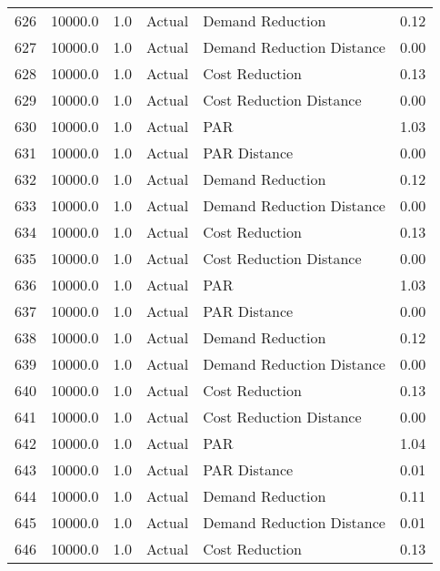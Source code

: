 \begin{longtable}{lrrllr}
626  &      10000.0 &     1.0 &         Actual &           Demand Reduction &   0.12 \\
627  &      10000.0 &     1.0 &         Actual &  Demand Reduction Distance &   0.00 \\
628  &      10000.0 &     1.0 &         Actual &             Cost Reduction &   0.13 \\
629  &      10000.0 &     1.0 &         Actual &    Cost Reduction Distance &   0.00 \\
630  &      10000.0 &     1.0 &         Actual &                        PAR &   1.03 \\
631  &      10000.0 &     1.0 &         Actual &               PAR Distance &   0.00 \\
632  &      10000.0 &     1.0 &         Actual &           Demand Reduction &   0.12 \\
633  &      10000.0 &     1.0 &         Actual &  Demand Reduction Distance &   0.00 \\
634  &      10000.0 &     1.0 &         Actual &             Cost Reduction &   0.13 \\
635  &      10000.0 &     1.0 &         Actual &    Cost Reduction Distance &   0.00 \\
636  &      10000.0 &     1.0 &         Actual &                        PAR &   1.03 \\
637  &      10000.0 &     1.0 &         Actual &               PAR Distance &   0.00 \\
638  &      10000.0 &     1.0 &         Actual &           Demand Reduction &   0.12 \\
639  &      10000.0 &     1.0 &         Actual &  Demand Reduction Distance &   0.00 \\
640  &      10000.0 &     1.0 &         Actual &             Cost Reduction &   0.13 \\
641  &      10000.0 &     1.0 &         Actual &    Cost Reduction Distance &   0.00 \\
642  &      10000.0 &     1.0 &         Actual &                        PAR &   1.04 \\
643  &      10000.0 &     1.0 &         Actual &               PAR Distance &   0.01 \\
644  &      10000.0 &     1.0 &         Actual &           Demand Reduction &   0.11 \\
645  &      10000.0 &     1.0 &         Actual &  Demand Reduction Distance &   0.01 \\
646  &      10000.0 &     1.0 &         Actual &             Cost Reduction &   0.13 \\

\end{longtable}
